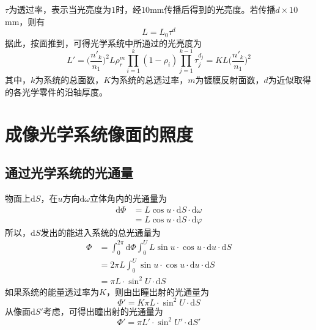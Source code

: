 \documentclass[cn,10pt,chinesefont=founder,math=newtx,cite=super,twoside]{elegantbook}
\begin{document}
$\tau$为透过率，表示当光亮度为$1$时，经$10$mm传播后得到的光亮度。若传播$d\times10$mm，则有
\begin{equation}
L=L_0\tau^d
\end{equation}
据此，按面推到，可得光学系统中所通过的光亮度为
\begin{equation}
L'=\bigg(\frac{n'_k}{n_1}\bigg)^2L\rho^m_r\prod^k_{i=1}(1-\rho_i)\prod^{k-1}_{j=1}\tau^{d_j}_{j}=KL\bigg(\frac{n'_k}{n_1}\bigg)^2
\end{equation}
其中，$k$为系统的总面数，$K$为系统的总透过率，$m$为镀膜反射面数，$d$为近似取得的各光学零件的沿轴厚度。

\section{成像光学系统像面的照度}
\subsection{通过光学系统的光通量}
物面上$\mathrm{d}S$，在$u$方向$\mathrm{d}\omega$立体角内的光通量为
\begin{equation}
\begin{aligned}
\mathrm{d}\varPhi&=L\cos u\cdot\mathrm{d}S\cdot\mathrm{d}\omega\\
&=L\cos u\cdot\mathrm{d}S\cdot\mathrm{d}\varphi
\end{aligned}
\end{equation}
所以，$\mathrm{d}S$发出的能进入系统的总光通量为
\begin{equation}
\begin{aligned}
\varPhi&=\int^{2\pi}_0\mathrm{d}\varPhi\int^U_0L\sin u\cdot\cos u\cdot\mathrm{d}u\cdot\mathrm{d}S\\
&=2\pi L\int^U_0\sin u\cdot\cos u\cdot\mathrm{d}u\cdot\mathrm{d}S\\
&=\pi L\cdot\sin^2U\cdot\mathrm{d}S
\end{aligned}
\end{equation}
如果系统的能量透过率为$K$，则由出瞳出射的光通量为
\begin{equation}
\varPhi'=K\pi L\cdot\sin^2U\cdot\mathrm{d}S
\end{equation}
从像面$\mathrm{d}S'$考虑，可得出瞳出射的光通量为
\begin{equation}
\varPhi'=\pi L'\cdot\sin^2U'\cdot\mathrm{d}S'
\end{equation}
\end{document}
